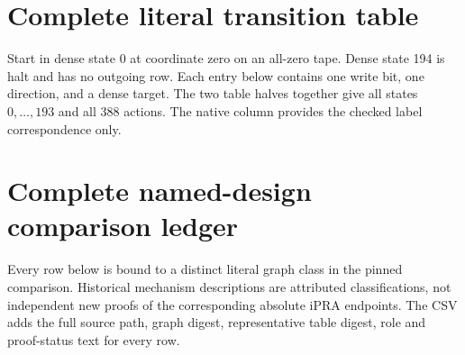 \documentclass[10pt,a4paper]{article}
\theoremstyle{definition}
\begin{document}
\clearpage
\appendix
\section{Complete literal transition table}
\label{sec:table}

Start in dense state 0 at coordinate zero on an all-zero tape. Dense
state 194 is halt and has no outgoing row. Each entry below contains
one write bit, one direction, and a dense target. The two table halves
together give all states $0,\ldots,193$ and all 388 actions. The native
column provides the checked label correspondence only.


\clearpage
\section{Complete named-design comparison ledger}
\label{sec:ledger}

Every row below is bound to a distinct literal graph class in the pinned
comparison. Historical mechanism descriptions are attributed classifications,
not independent new proofs of the corresponding absolute iPRA endpoints.
The CSV adds the full source path, graph digest, representative table
digest, role and proof-status text for every row.

\end{document}
